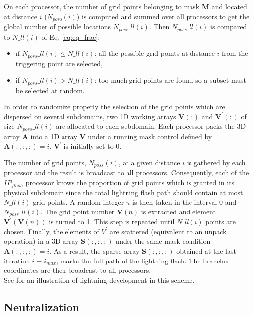 On each processor, the number of grid points belonging to mask $\mathbf{M}$ and located at distance $i$ ($N_{poss}(i)$) is computed and summed over all processors to get the global number of possible locations $N_{poss}\_ll(i)$.
Then $N_{poss}\_ll(i)$ is compared to $N\_ll(i)$ of Eq. \ref{eq:eq_frac}:
\begin{itemize}
 \item if $N_{poss}\_ll(i) \leq N\_ll(i)$: all the possible grid points at distance $i$ from the triggering point are selected,
 \item if $N_{poss}\_ll(i) > N\_ll(i)$: too much grid points are found so a subset must be selected at random.
\end{itemize}

In order to randomize properly the selection of the grid points which are dispersed on several subdomains, two 1D working arrays $\mathbf{V}(:)$ and $\mathbf{V^\prime}(:)$ of size $N_{poss}\_ll(i)$ are allocated to each subdomain.
Each processor packs the 3D array $\mathbf{A}$ into a 1D array $\mathbf{V}$ under a running mask control defined by $\mathbf{A}(:,:,:) = i$.
$\mathbf{V^\prime}$ is initially set to 0.

The number of grid points, $N_{poss}(i)$, at a given distance $i$ is gathered by each processor and the result is broadcast to all processors.
Consequently, each of the $IP_{flash}$ processor knows the proportion of grid points which is granted in its physical subdomain since the total lightning flash path should contain at most $N\_ll(i)$ grid points.
A random integer $n$ is then taken in the interval 0 and $N_{poss}\_ll(i)$.
The grid point number $\mathbf{V}(n)$ is extracted and element $\mathbf{V}^\prime(\mathbf{V}(n))$ is turned to 1.
This step is repeated until $N\_ll(i)$ points are chosen.
Finally, the elements of $V^\prime$ are scattered (equivalent to an unpack operation) in a 3D array $\mathbf{S}(:,:,:)$ under the same mask condition $\mathbf{A}(:,:,:) = i$. 
As a result, the sparse array $\mathbf{S}(:,:,:)$ obtained at the last iteration $i=i_{max}$, marks the full path of the lightning flash.
The branches coordinates are then broadcast to all processors.\\

See \citet{Barthe-2012} for an illustration of lightning development in this scheme.

\subsection{Neutralization}
\label{sec:neut}

